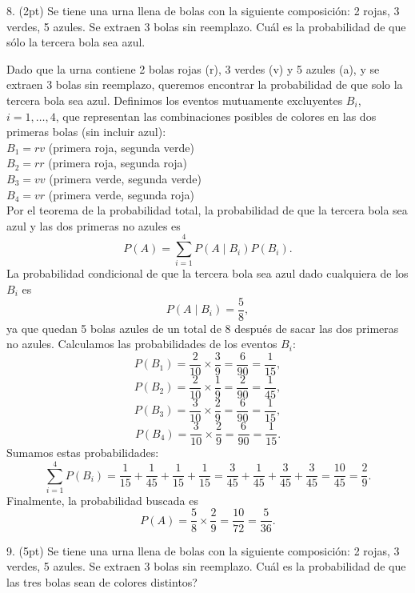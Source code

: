 

8. (2pt) Se tiene una urna llena de bolas con la siguiente composición: 2 rojas, 3 verdes, 5 azules. Se extraen 3 bolas sin reemplazo. Cuál es la probabilidad de que sólo la tercera bola sea azul.

Dado que la urna contiene 2 bolas rojas (r), 3 verdes (v) y 5 azules (a), y se extraen 3 bolas sin reemplazo, queremos encontrar la probabilidad de que solo la tercera bola sea azul.
Definimos los eventos mutuamente excluyentes \(B_i\), \(i = 1, \ldots, 4\), que representan las combinaciones posibles de colores en las dos primeras bolas (sin incluir azul):\\

\(B_1 = rv\) (primera roja, segunda verde)\\
\(B_2 = rr\) (primera roja, segunda roja)\\
\(B_3 = vv\) (primera verde, segunda verde)\\
\(B_4 = vr\) (primera verde, segunda roja)\\

Por el teorema de la probabilidad total, la probabilidad de que la tercera bola sea azul y las dos primeras no azules es
\[
P(A) = \sum_{i=1}^4 P(A \mid B_i) P(B_i).
\]
La probabilidad condicional de que la tercera bola sea azul dado cualquiera de los \(B_i\) es
\[
P(A \mid B_i) = \frac{5}{8},
\]
ya que quedan 5 bolas azules de un total de 8 después de sacar las dos primeras no azules.
Calculamos las probabilidades de los eventos \(B_i\):
\[
P(B_1) = \frac{2}{10} \times \frac{3}{9} = \frac{6}{90} = \frac{1}{15},
\]
\[
P(B_2) = \frac{2}{10} \times \frac{1}{9} = \frac{2}{90} = \frac{1}{45},
\]
\[
P(B_3) = \frac{3}{10} \times \frac{2}{9} = \frac{6}{90} = \frac{1}{15},
\]
\[
P(B_4) = \frac{3}{10} \times \frac{2}{9} = \frac{6}{90} = \frac{1}{15}.
\]
Sumamos estas probabilidades:
\[
\sum_{i=1}^4 P(B_i) = \frac{1}{15} + \frac{1}{45} + \frac{1}{15} + \frac{1}{15} = \frac{3}{45} + \frac{1}{45} + \frac{3}{45} + \frac{3}{45} = \frac{10}{45} = \frac{2}{9}.
\]
Finalmente, la probabilidad buscada es
\[
P(A) = \frac{5}{8} \times \frac{2}{9} = \frac{10}{72} = \frac{5}{36}.
\]

9. (5pt) Se tiene una urna llena de bolas con la siguiente composición: 2 rojas, 3 verdes, 5 azules. Se extraen 3 bolas sin reemplazo. Cuál es la probabilidad de que las tres bolas sean de colores distintos?

